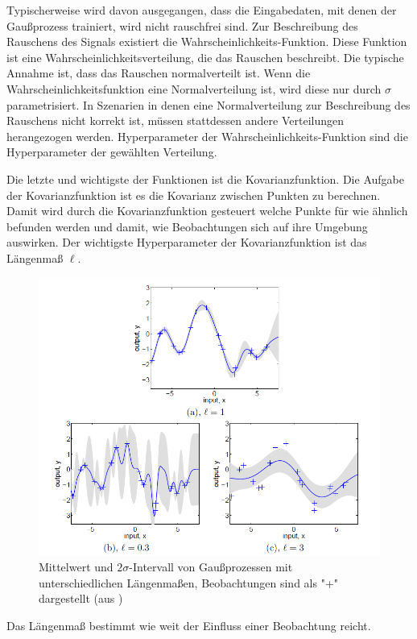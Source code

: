Typischerweise wird davon ausgegangen, dass die Eingabedaten, mit denen der Gaußprozess trainiert, wird nicht rauschfrei sind.
Zur Beschreibung des Rauschens des Signals existiert die Wahrscheinlichkeits-Funktion.
Diese Funktion ist eine Wahrscheinlichkeitsverteilung, die das Rauschen beschreibt.
Die typische Annahme ist, dass das Rauschen normalverteilt ist.
Wenn die Wahrscheinlichkeitsfunktion eine Normalverteilung ist, wird diese nur durch $\sigma$ parametrisiert.
In Szenarien in denen eine Normalverteilung zur Beschreibung des Rauschens nicht korrekt ist, müssen stattdessen andere Verteilungen herangezogen werden.
Hyperparameter der Wahrscheinlichkeits-Funktion sind die Hyperparameter der gewählten Verteilung.

Die letzte und wichtigste der Funktionen ist die Kovarianzfunktion.
Die Aufgabe der Kovarianzfunktion ist es die Kovarianz zwischen Punkten zu berechnen.
Damit wird durch die Kovarianzfunktion gesteuert welche Punkte für wie ähnlich befunden werden und damit, wie Beobachtungen sich auf ihre Umgebung auswirken.
Der wichtigste Hyperparameter der Kovarianzfunktion ist das Längenmaß $\ell$.
\begin{figure}[h]
	\centering
	\includegraphics[width=1\linewidth]{bilder/lengthscale}
	\caption{Mittelwert und $2\sigma$-Intervall von Gaußprozessen mit unterschiedlichen Längenmaßen, Beobachtungen sind als "+" dargestellt (aus \cite{Rasmussen.2008})}
	\label{fig:lengthscale}
\end{figure}
Das Längenmaß bestimmt wie weit der Einfluss einer Beobachtung reicht.
